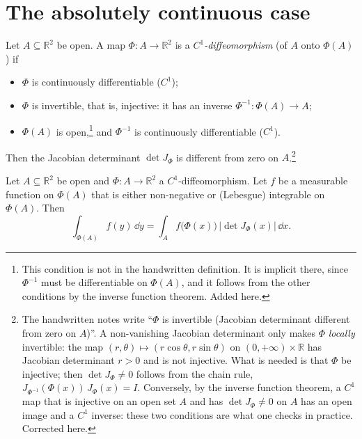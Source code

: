 
\section{The absolutely continuous case}\label{sec:rv-ac}

\begin{definition}[$C^1$-diffeomorphism]\label{def:rv-diffeomorphism}
Let $A\subseteq\mathbb R^2$ be open. A map $\Phi:A\to\mathbb R^2$ is a \emph{$C^1$-diffeomorphism}
(of $A$ onto $\Phi(A)$) if
\begin{itemize}
  \item $\Phi$ is continuously differentiable ($C^1$);
  \item $\Phi$ is invertible, that is, injective: it has an inverse $\Phi^{-1}:\Phi(A)\to A$;
  \item $\Phi(A)$ is open,\footnote{This condition is not in the handwritten definition. It is
    implicit there, since $\Phi^{-1}$ must be differentiable on $\Phi(A)$, and it follows from the
    other conditions by the inverse function theorem. Added here.} and $\Phi^{-1}$ is continuously
    differentiable ($C^1$).
\end{itemize}
Then the Jacobian determinant $\det J_\Phi$ is different from zero on $A$.\footnote{The handwritten
notes write ``$\Phi$ is invertible (Jacobian determinant different from zero on $A$)''. A
non-vanishing Jacobian determinant only makes $\Phi$ \emph{locally} invertible: the map
$(r,\theta)\mapsto(r\cos\theta,r\sin\theta)$ on $(0,+\infty)\times\mathbb R$ has Jacobian determinant
$r>0$ and is not injective. What is needed is that $\Phi$ be injective; then $\det J_\Phi\ne0$
follows from the chain rule, $J_{\Phi^{-1}}(\Phi(x))\,J_\Phi(x)=I$. Conversely, by the inverse
function theorem, a $C^1$ map that is injective on an open set $A$ and has $\det J_\Phi\ne0$ on $A$
has an open image and a $C^1$ inverse: these two conditions are what one checks in practice.
Corrected here.}
\end{definition}

\begin{theorem}\label{thm:rv-jacobi}
Let $A\subseteq\mathbb R^2$ be open and $\Phi:A\to\mathbb R^2$ a $C^1$-diffeomorphism. Let $f$ be a
measurable function on $\Phi(A)$ that is either non-negative or (Lebesgue) integrable on $\Phi(A)$.
Then
\[
  \int_{\Phi(A)}f(y)\,\dd y=\int_Af\big(\Phi(x)\big)\,\big|\det J_\Phi(x)\big|\,\dd x .
\]
\end{theorem}

